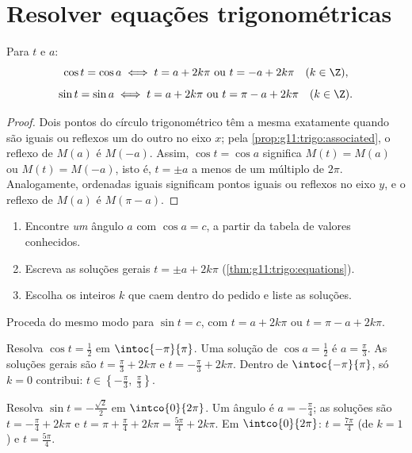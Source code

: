 \section{Resolver equações trigonométricas}

\begin{theorem}[As equações $\cos t = \cos a$ e $\sin t = \sin a$]
\label{thm:g11:trigo:equations}
Para  $t$ e $a$:
\[
\cos t = \cos a \iff t = a + 2k\pi \ \text{ou}\ t = -a + 2k\pi
\quad (k \in \Z),
\]
\[
\sin t = \sin a \iff t = a + 2k\pi \ \text{ou}\ t = \pi - a + 2k\pi
\quad (k \in \Z).
\]
\end{theorem}

\begin{proof}
Dois pontos do círculo trigonométrico têm a mesma  exatamente
quando são iguais ou reflexos um do outro no eixo $x$; pela
\cref{prop:g11:trigo:associated}, o reflexo de $M(a)$ é $M(-a)$. Assim,
$\cos t = \cos a$ significa $M(t) = M(a)$ ou $M(t) = M(-a)$, isto é,
$t = \pm a$ a menos de um múltiplo de $2\pi$. Analogamente, ordenadas
iguais significam pontos iguais ou reflexos no eixo $y$, e o reflexo de
$M(a)$ é $M(\pi - a)$.
\end{proof}

\begin{method}[Resolver $\cos t = c$ em um intervalo]\label{met:g11:trigo:solve}
\begin{enumerate}
  \item Encontre \emph{um} ângulo $a$ com $\cos a = c$, a partir da
        tabela de valores conhecidos.
  \item Escreva as soluções gerais $t = \pm a + 2k\pi$
        (\cref{thm:g11:trigo:equations}).
  \item Escolha os inteiros $k$ que caem dentro do  pedido e
        liste as soluções.
\end{enumerate}
Proceda do mesmo modo para $\sin t = c$, com $t = a + 2k\pi$ ou
$t = \pi - a + 2k\pi$.
\end{method}

\begin{example}\label{ex:g11:trigo:solve}
Resolva $\cos t = \frac12$ em $\intoc{-\pi}{\pi}$. Uma solução de
$\cos a = \frac12$ é $a = \frac{\pi}{3}$. As soluções gerais são
$t = \frac\pi3 + 2k\pi$ e $t = -\frac\pi3 + 2k\pi$. Dentro de
$\intoc{-\pi}{\pi}$, só $k = 0$ contribui:
$t \in \left\{-\frac\pi3,\ \frac\pi3\right\}$.

Resolva $\sin t = -\frac{\sqrt2}{2}$ em $\intco{0}{2\pi}$. Um ângulo é
$a = -\frac\pi4$; as soluções são $t = -\frac\pi4 + 2k\pi$ e
$t = \pi + \frac\pi4 + 2k\pi = \frac{5\pi}{4} + 2k\pi$. Em
$\intco{0}{2\pi}$: $t = \frac{7\pi}{4}$ (de $k = 1$) e
$t = \frac{5\pi}{4}$.
\end{example}

